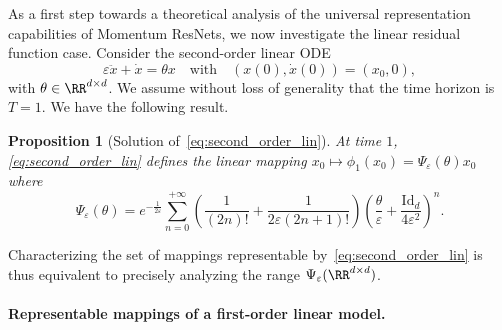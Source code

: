 \documentclass{article}
\newtheorem{proposition}{Proposition}
\begin{document}
As a first step towards a theoretical analysis of the universal representation capabilities of Momentum ResNets, we now investigate the linear residual function case.
Consider the second-order linear ODE 
\begin{equation}\label{eq:second_order_lin}
  \varepsilon \ddot{x}  + \dot{x} = \theta x 
  \quad\text{with}\quad
 (x(0),\dot{x}(0)) = (x_0,0),
\end{equation}
with $\theta \in \RR^{d\times d}$. We assume without loss of generality that the time horizon is $T = 1$. We have the following result.
\begin{proposition}[Solution of~\eqref{eq:second_order_lin}]\label{prop:sol_second_order}
At time $1$, \eqref{eq:second_order_lin} defines the linear mapping $x_0 \mapsto \phi_1(x_0) = \Psi_{\varepsilon}(\theta)x_0$ where 
\begin{equation*}
\Psi_{\varepsilon}(\theta)=  e^{-\frac{1}{2\varepsilon}} \sum_{n=0}^{+\infty} \left(\frac{1}{(2n)!} + \frac{1}{2\varepsilon(2n+1)!}\right) \left(\frac{\theta}{\varepsilon} + \frac{\mathrm{Id}_d}{4 \varepsilon^2}\right)^n.
\end{equation*}
\end{proposition}
Characterizing the set of mappings representable by~\eqref{eq:second_order_lin} is thus equivalent to precisely analyzing the range $\Psi_{\varepsilon}(\RR^{d\times d})$.


\paragraph{Representable mappings of a first-order linear model.}
\end{document}
